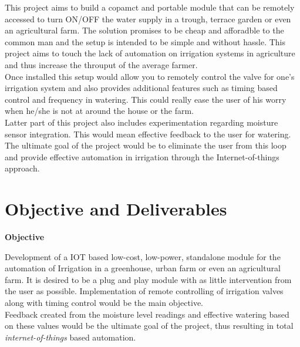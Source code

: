 \documentclass[16pt]{article}
\begin{document}
 \vspace{0.5cm}
 This project aims to build a copamct and portable module that can be remotely accessed 
 to turn ON/OFF the water supply in a trough, terrace garden or even an agricultural farm. The solution promises to be cheap and afforadble to the common man and 
 the setup is intended to be simple and without hassle. This project aims to touch the lack of automation on irrigation systems in agriculture 
 and thus increase the throuput of the average farmer. \\
 
 Once installed this setup would allow you to remotely control the valve for one's irrigation system and also provides additional features such as 
 timing based control and frequency in watering. This could really ease the user of his worry when he/she is not at around the house or the farm. \\
 
 Latter part of this project also includes experimentation regarding moisture sensor integration. This would mean effective feedback to the user for 
 watering. The ultimate goal of the project would be to eliminate the user from this loop and provide effective automation in irrigation through the 
 Internet-of-things approach.


\vspace{12cm}



\section{Objective and Deliverables} 

\vspace{1cm}
  {\Large{\textbf{Objective}}} \\
  
  \vspace{0.1cm}
  
  Development of a IOT based low-cost, low-power, standalone module for the automation of Irrigation in a greenhouse, urban farm or even an agricultural farm.
  It is desired to be a plug and play module with as little intervention from the user as possible. Implementation of remote controlling of irrigation valves 
  along with timing control would be the main objective.\\ Feedback created from the moisture level readings and effective watering based on these values 
  would be the ultimate goal of the project, thus resulting in total \emph{internet-of-things} based automation.
  
\end{document}
